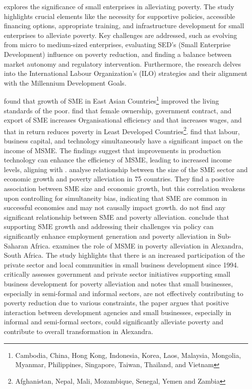 \documentclass [12pt]{article}
\begin{document}
\textcite{vandenberg2006poverty} explores the significance of small enterprises in alleviating poverty. The study highlights crucial elements like the necessity for supportive policies, accessible financing options, appropriate training, and infrastructure development for small enterprises to alleviate poverty. Key challenges are addressed, such as evolving from micro to medium-sized enterprises, evaluating SED's (Small Enterprise Development) influence on poverty reduction, and finding a balance between market autonomy and regulatory intervention. Furthermore, the research delves into the International Labour Organization's (ILO) strategies and their alignment with the Millennium Development Goals.

\textcite{harvie2003contribution} found that growth of SME in East Asian Countries\footnote{Cambodia, China, Hong Kong, Indonesia, Korea, Laos, Malaysia, Mongolia, Myanmar, Philippines, Singapore, Taiwan, Thailand, and Vietnam} improved the living standards of the poor. \textcite{MAKSIMOV2017244} find that female ownership, government contract, and export of SME increases Organisational efficiency and that increases wages, and that in return reduces poverty in Least Developed Countries\footnote{Afghanistan, Nepal, Mali, Mozambique, Senegal, Yemen and Zambia}. \textcite{wibiseno2021influence} find that labour, business capital, and technology simultaneously have a significant impact on the income of MSME. The findings suggest that improvements in production technology can enhance the efficiency of MSME, leading to increased income levels, aligning with \textcite{MAKSIMOV2017244}. \textcite{Beck2003SMEGrowth} analyse relationship between the size of the SME sector and economic growth and poverty alleviation in 75 countries.  They find a positive association between SME size and economic growth, but this correlation weakens upon controlling for simultaneity bias, indicating that SME are common in successful economies and may not causally impact growth. \textcite{Beck2003SMEGrowth} do not find any significant relationship between SME and poverty alleviation. \textcite{abisuga2020smes} conclude that supporting SME growth and addressing their challenges via policy can significantly enhance employment generation and poverty alleviation in Sub-Saharan Africa. \textcite{Agupusi2007} examines the role of MSME in poverty alleviation in Alexandra, South Africa. The study highlights that there is an increased participation of the private sector and local communities in small business development since 1994. \textcite{Agupusi2007} critically assesses government and private sector initiatives supporting small business development for poverty alleviation and notes that small businesses, especially in semi-formal and informal sectors, are not effectively contributing to poverty reduction due to various constraints, the paper argues that positive interaction between development agencies and small businesses, especially in informal and semi-formal sectors, could significantly alleviate poverty and contribute to overall transformation in Alexandra. 
\end{document}
